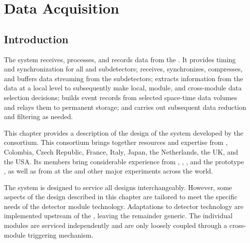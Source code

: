 \glsresetall

\chapter{Data Acquisition}
\label{ch:sp-daq}

\section{Introduction}
\label{sec:fd-daq:introduction}

The   system receives,
processes, and records data from the  .
It provides
timing and synchronization for all  and
subdetectors; receives, synchronizes, compresses, and buffers data
streaming from the subdetectors; extracts information from the data at a
local level to subsequently make local, module, and cross-module data
selection decisions; builds event records
from selected space-time data volumes 
and relays them to permanent storage; and carries out subsequent data
reduction and filtering as needed.

This chapter provides a description of the design of the 
  system developed by the  
 consortium. 
This consortium brings together resources and expertise from ,
Colombia, Czech Republic, France, Italy, Japan, the Netherlands, the UK, and the USA. 
Its members bring considerable experience from , ,
, and the
 prototype , as well as from  at the  and other major
 experiments across the world.

The system is designed to service all   designs
interchangeably.  However, some aspects of the  design described in
this chapter are tailored to meet the specific needs of the 
detector module technology.  Adaptations to detector technology are
implemented upstream of the , leaving the remainder generic. The
individual modules are serviced independently and are only loosely
coupled through a cross-module triggering mechanism.

